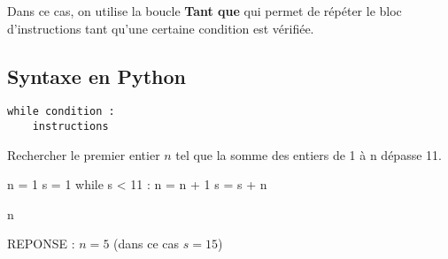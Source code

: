 Dans ce cas, on utilise la boucle \textbf{Tant que} qui permet de répéter le bloc d'instructions 
tant qu'une certaine condition est vérifiée.


\vspace{1cm}



\subsection{Syntaxe en Python}


\begin{lstlisting}
while condition :
    instructions
\end{lstlisting}



\vspace{0.5cm}
\label{ex-suite}
Rechercher le premier entier $n$ tel que la somme des entiers de 1 à n dépasse 11.

\begin{pyconsole}
n = 1
s = 1
while s < 11 :
    n = n + 1
    s = s + n
    
n
\end{pyconsole}

\begin{center}
REPONSE  : $n=5$  (dans ce cas $s=15$)
\end{center}

